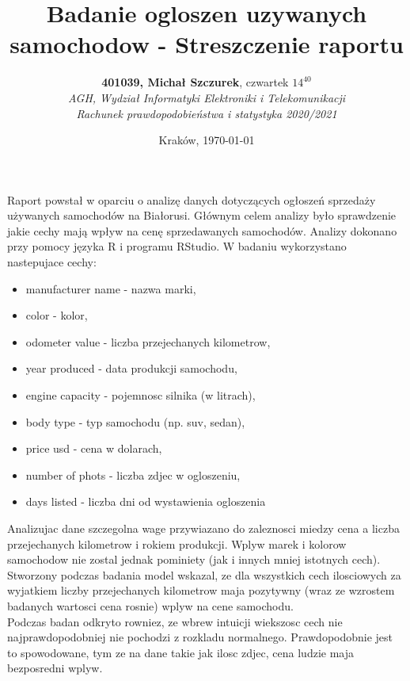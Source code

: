 \documentclass{article}
\title{Badanie ogloszen uzywanych samochodow - Streszczenie raportu}
\author{\textbf{401039, Michał Szczurek}, czwartek $14^{40}$\\ 
\textit{AGH, Wydział Informatyki Elektroniki i Telekomunikacji}\\
\textit{Rachunek prawdopodobieństwa i statystyka 2020/2021}}
\date{Kraków, \today}
\begin{document}

\maketitle
  Raport powstał w oparciu o analizę danych dotyczących ogłoszeń sprzedaży używanych
samochodów na Białorusi. Głównym celem analizy było sprawdzenie jakie cechy mają
wpływ na cenę sprzedawanych samochodów. Analizy dokonano przy pomocy języka R i 
programu RStudio.
W badaniu wykorzystano nastepujace cechy:
\begin{itemize}
\item manufacturer name - nazwa marki,
\item color - kolor,
\item odometer value - liczba przejechanych kilometrow,
\item year produced - data produkcji samochodu,
\item engine capacity - pojemnosc silnika (w litrach),
\item body type - typ samochodu (np. suv, sedan),
\item price usd - cena w dolarach,
\item number of phots - liczba zdjec w ogloszeniu,
\item days listed - liczba dni od wystawienia ogloszenia
\end{itemize}

Analizujac dane szczegolna wage przywiazano do zaleznosci miedzy cena a liczba przejechanych kilometrow i rokiem produkcji. Wplyw marek i kolorow samochodow nie zostal jednak pominiety (jak i innych mniej istotnych cech). 
\\
Stworzony podczas badania model wskazal, ze dla wszystkich cech ilosciowych za wyjatkiem liczby przejechanych kilometrow maja pozytywny (wraz ze wzrostem  badanych wartosci cena rosnie) wplyw na cene samochodu.
\\
Podczas badan odkryto rowniez, ze wbrew intuicji wiekszosc cech nie najprawdopodobniej nie pochodzi z rozkladu normalnego. Prawdopodobnie jest to spowodowane, tym ze na dane takie jak ilosc zdjec, cena ludzie maja bezposredni wplyw.
\end{document}
